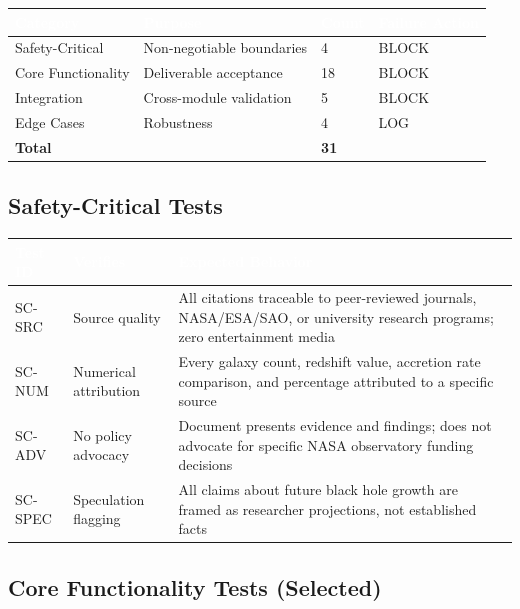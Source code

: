 \documentclass[11pt,letterpaper]{article}
\newcommand{\tableheader}[1]{\textbf{\sffamily\textcolor{white}{#1}}}
\begin{document}
\begin{center}
\begin{tabularx}{\textwidth}{L{3.5cm}XC{2cm}C{2.5cm}}
\toprule
{}
\tableheader{Category} & \tableheader{Purpose} & \tableheader{Count} & \tableheader{Failure Action} \\
\midrule
Safety-Critical & Non-negotiable boundaries & 4 & BLOCK \\
Core Functionality & Deliverable acceptance & 18 & BLOCK \\
Integration & Cross-module validation & 5 & BLOCK \\
Edge Cases & Robustness & 4 & LOG \\
\midrule
\textbf{Total} & & \textbf{31} & \\
\bottomrule
\end{tabularx}
\end{center}

\subsection{Safety-Critical Tests}

\begin{center}
\begin{tabularx}{\textwidth}{C{1.5cm}L{4cm}X}
\toprule
{}
\tableheader{Test ID} & \tableheader{Verifies} & \tableheader{Expected Behavior} \\
\midrule
SC-SRC & Source quality & All citations traceable to peer-reviewed journals, NASA/ESA/SAO, or university research programs; zero entertainment media \\
SC-NUM & Numerical attribution & Every galaxy count, redshift value, accretion rate comparison, and percentage attributed to a specific source \\
SC-ADV & No policy advocacy & Document presents evidence and findings; does not advocate for specific NASA observatory funding decisions \\
SC-SPEC & Speculation flagging & All claims about future black hole growth are framed as researcher projections, not established facts \\
\bottomrule
\end{tabularx}
\end{center}

\subsection{Core Functionality Tests (Selected)}
\end{document}
